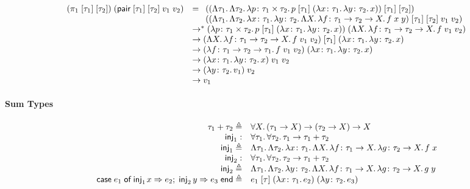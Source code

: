 \documentclass{lecturenotes}
\newcommand{\tabs}[3]{\ensuremath{\lambda #1 \colon #2.\,#3}}
\newcommand{\app}[2]{\ensuremath{#1\;#2}}
\newcommand{\sumtype}[2]{\ensuremath{#1 + #2}}
\newcommand{\injl}[1]{\ensuremath{\textsf{inj}_1\mkern2mu#1}}
\newcommand{\injr}[1]{\ensuremath{\textsf{inj}_2\mkern3mu#1}}
\newcommand{\case}[5]{\ensuremath{\textsf{case}\mkern5mu#1\mkern5mu\textsf{of}\mkern5mu\injl{#2} \Rightarrow #3;\mkern5mu\injr{#4} \Rightarrow #5\mkern5mu\textsf{end}}}
\newcommand{\fatype}[2]{\ensuremath{\forall #1.\,#2}}
\newcommand{\Abs}[2]{\Lambda #1.\,#2}
\newcommand{\App}[2]{#1\;[#2]}
\begin{document}
$$
\begin{array}{ll}
  \app{(\App{\App{\pi_1}{\tau_1}}{\tau_2})}{(\app{\app{\App{\App{\textsf{pair}}{\tau_1}}{\tau_2}}{v_1}}{v_2})} &= \begin{array}[t]{l}(\App{\App{(\Abs{\tau_1}{\Abs{\tau_2}{\tabs{p}{\tau_1 \times \tau_2}{\app{\App{p}{\tau_1}}{(\tabs{x}{\tau_1}{\tabs{y}{\tau_2}{x}})}}}})}{\tau_1}}{\tau_2})\\(\app{\app{\App{\App{(\Abs{\tau_1}{\Abs{\tau_2}{\tabs{x}{\tau_1}{\tabs{y}{\tau_2}{\Abs{X}{\tabs{f}{\tau_1 \to \tau_2 \to X}{\app{\app{f}{x}}{y}}}}}}})}{\tau_1}}{\tau_2}}{v_1}}{v_2})\end{array}\\
                                                                                             &\to^\ast \app{(\tabs{p}{\tau_1 \times \tau_2}{\app{\App{p}{\tau_1}}{(\tabs{x}{\tau_1}{\tabs{y}{\tau_2}{x}})}})}{(\Abs{X}{\tabs{f}{\tau_1 \to \tau_2 \to X}{\app{\app{f}{v_1}}{v_2}}})}\\
                                                                                             &\to \app{\App{(\Abs{X}{\tabs{f}{\tau_1 \to \tau_2 \to X}{\app{\app{f}{v_1}}{v_2}}})}{\tau_1}}{(\tabs{x}{\tau_1}{\tabs{y}{\tau_2}{x}})}\\
                                                                                             &\to \app{(\tabs{f}{\tau_1 \to \tau_2 \to \tau_1}{\app{\app{f}{v_1}}{v_2}})}{(\tabs{x}{\tau_1}{\tabs{y}{\tau_2}{x}})}\\
                                                                                             &\to \app{\app{(\tabs{x}{\tau_1}{\tabs{y}{\tau_2}{x}})}{v_1}}{v_2}\\
                                                                                             &\to \app{(\tabs{y}{\tau_2}{v_1})}{v_2}\\
                                                                                             &\to v_1
\end{array}
$$

\paragraph{Sum Types}
$$
\begin{array}{rl}
  \sumtype{\tau_1}{\tau_2} \triangleq& \fatype{X}{(\tau_1 \to X) \to (\tau_2 \to X) \to X}\\
  \textsf{inj}_1 :& \fatype{\tau_1}{\fatype{\tau_2}{\tau_1 \to \tau_1 + \tau_2}}\\
  \textsf{inj}_1 \triangleq& \Abs{\tau_1}{\Abs{\tau_2}{\tabs{x}{\tau_1}{\Abs{X}{\tabs{f}{\tau_1 \to X}{\tabs{g}{\tau_2 \to X}{\app{f}{x}}}}}}}\\
  \textsf{inj}_2 :& \fatype{\tau_1}{\fatype{\tau_2}{\tau_2 \to \tau_1 + \tau_2}}\\
  \textsf{inj}_2 \triangleq& \Abs{\tau_1}{\Abs{\tau_2}{\tabs{y}{\tau_2}{\Abs{X}{\tabs{f}{\tau_1 \to X}{\tabs{g}{\tau_2 \to X}{\app{g}{y}}}}}}}\\
  \case{e_1}{x}{e_2}{y}{e_3} \triangleq& \app{\app{\App{e_1}{\tau}}{(\tabs{x}{\tau_1}{e_2})}}{(\tabs{y}{\tau_2}{e_3})}
\end{array}
$$
\end{document}
